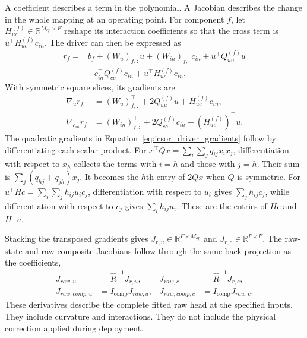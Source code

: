 A coefficient describes a term in the polynomial. A Jacobian describes the change in the whole mapping at an operating point. For component \(f\), let \(H_{uc}^{(f)}\in\mathbb{R}^{M_{op}\times F}\) reshape its interaction coefficients so that the cross term is \(u^\top H_{uc}^{(f)}c_{in}\). The driver can then be expressed as
\begin{equation}
\label{eq:icsor_driver_component}
\begin{aligned}
r_f={}&b_f+(W_u)_{f,:}u+(W_{in})_{f,:}c_{in}
+u^\top Q_{uu}^{(f)}u\\
&+c_{in}^\top Q_{cc}^{(f)}c_{in}
+u^\top H_{uc}^{(f)}c_{in}.
\end{aligned}
\end{equation}
With symmetric square slices, its gradients are
\begin{equation}
\label{eq:icsor_driver_gradients}
\begin{aligned}
\nabla_u r_f&=(W_u)_{f,:}^\top+2Q_{uu}^{(f)}u
+H_{uc}^{(f)}c_{in},\\
\nabla_{c_{in}}r_f&=(W_{in})_{f,:}^\top+2Q_{cc}^{(f)}c_{in}
+(H_{uc}^{(f)})^\top u.
\end{aligned}
\end{equation}
The quadratic gradients in Equation~\eqref{eq:icsor_driver_gradients} follow by differentiating each scalar product. For \(x^\top Qx=\sum_i\sum_jq_{ij}x_ix_j\), differentiation with respect to \(x_h\) collects the terms with \(i=h\) and those with \(j=h\). Their sum is \(\sum_j(q_{hj}+q_{jh})x_j\). It becomes the \(h\)th entry of \(2Qx\) when \(Q\) is symmetric. For \(u^\top Hc=\sum_i\sum_jh_{ij}u_ic_j\), differentiation with respect to \(u_i\) gives \(\sum_jh_{ij}c_j\), while differentiation with respect to \(c_j\) gives \(\sum_i h_{ij}u_i\). These are the entries of \(Hc\) and \(H^\top u\).

Stacking the transposed gradients gives \(J_{r,u}\in\mathbb{R}^{F\times M_{op}}\) and \(J_{r,c}\in\mathbb{R}^{F\times F}\). The raw-state and raw-composite Jacobians follow through the same back projection as the coefficients,
\begin{equation}
\label{eq:icsor_raw_jacobians}
\begin{aligned}
J_{raw,u}&=\widehat R^{-1}J_{r,u},
&J_{raw,c}&=\widehat R^{-1}J_{r,c},\\
J_{raw,comp,u}&=I_{\mathrm{comp}}J_{raw,u},
&J_{raw,comp,c}&=I_{\mathrm{comp}}J_{raw,c}.
\end{aligned}
\end{equation}
These derivatives describe the complete fitted raw head at the specified inputs. They include curvature and interactions. They do not include the physical correction applied during deployment.

